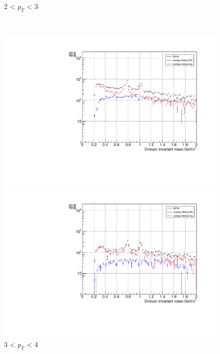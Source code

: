 \begin{figure}[htbp]
\begin{minipage}{0.45\textwidth}
                        \caption{2 < $p_{T}$ < 3}
                        \label{Analysis:Dimuon:CB:CB_2to3}
                    \end{minipage}
                    \\
                    \vspace{1em}
                    \begin{minipage}{0.45\textwidth}
                        \centering
                        \includegraphics[width=\textwidth]{fig/3_4_1_CB_pt_3to4.pdf}
                        \captionsetup{labelformat=empty}
                        \caption{3 < $p_{T}$ < 4}
                        \label{Analysis:Dimuon:CB:CB_3to4}
                    \end{minipage}
                    \hfill
                    \begin{minipage}{0.45\textwidth}
                        \centering
                        \includegraphics[width=\textwidth]{fig/3_4_1_CB_pt_4to5.pdf}

\end{minipage}
\end{figure}
